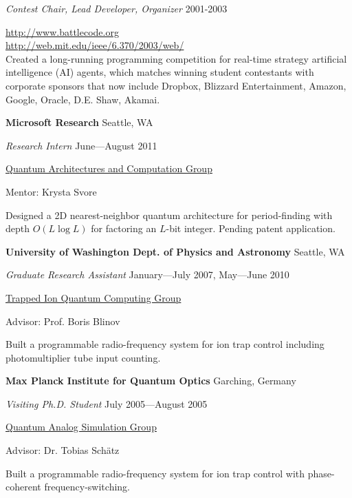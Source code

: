 \documentclass[letter]{article}
\begin{document}
{\em Contest Chair, Lead Developer, Organizer} \hfill 2001-2003
\vspace{0.5\baselineskip}
\par

\url{http://www.battlecode.org}\\
\url{http://web.mit.edu/ieee/6.370/2003/web/}\\
Created a long-running
programming competition for real-time strategy artificial intelligence
(AI) agents, which matches winning student contestants with corporate
sponsors that now include
Dropbox, Blizzard Entertainment, Amazon, Google, Oracle, D.E. Shaw, Akamai.

\pagebreak

\vspace{\baselineskip}
\par
{\bf {Microsoft Research}} \hfill Seattle, WA
\par
{\em Research Intern} \hfill June---August 2011
\par
\href{http://research.microsoft.com/en-us/groups/quarc/default.aspx}{Quantum Architectures and Computation Group}
\par
Mentor: Krysta Svore
\par
Designed a 2D nearest-neighbor quantum architecture for period-finding with
depth $O(L \log L)$ for factoring an $L$-bit integer. Pending patent
application.

\vspace{\baselineskip}
\par
{\bf {University of Washington Dept. of Physics and Astronomy}} \hfill Seattle, WA
\par
{\em Graduate Research Assistant} \hfill January---July 2007, May---June 2010
\par
\href{http://depts.washington.edu/qcomp/}{Trapped Ion Quantum Computing Group}
\par
Advisor: Prof. Boris Blinov
\par
Built a programmable radio-frequency system for ion trap control including
photomultiplier tube input counting.

\par

\vspace{\baselineskip}
\par
{\bf Max Planck Institute for Quantum Optics} \hfill Garching, Germany
\par
{\em Visiting Ph.D. Student} \hfill July 2005---August 2005
\par
\href{http://www.mpq.mpg.de/qsim/}{Quantum Analog Simulation Group}
\par
Advisor: Dr. Tobias Sch\"atz
\par
Built a programmable radio-frequency system for ion trap control with phase-coherent
frequency-switching.
\end{document}
